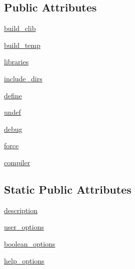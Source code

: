 \subsection*{Public Attributes}
\begin{DoxyCompactItemize}
\item 
\hyperlink{classsetuptools_1_1__distutils_1_1command_1_1build__clib_1_1build__clib_adbbb845504c2a18712782d201c98042e}{build\+\_\+clib}
\item 
\hyperlink{classsetuptools_1_1__distutils_1_1command_1_1build__clib_1_1build__clib_a4f79f4baa2d1c1db08f49344e992965a}{build\+\_\+temp}
\item 
\hyperlink{classsetuptools_1_1__distutils_1_1command_1_1build__clib_1_1build__clib_a1f44c483b10326b261561c35e5f5603b}{libraries}
\item 
\hyperlink{classsetuptools_1_1__distutils_1_1command_1_1build__clib_1_1build__clib_ab2c897ff2466048eba1fdfa34f49c655}{include\+\_\+dirs}
\item 
\hyperlink{classsetuptools_1_1__distutils_1_1command_1_1build__clib_1_1build__clib_a98fb7836f3e246f68141cb67771c560b}{define}
\item 
\hyperlink{classsetuptools_1_1__distutils_1_1command_1_1build__clib_1_1build__clib_a245b0dde6a868cc0c51f379584c4da35}{undef}
\item 
\hyperlink{classsetuptools_1_1__distutils_1_1command_1_1build__clib_1_1build__clib_aee42c73f34d36725aa53a9dc5d478089}{debug}
\item 
\hyperlink{classsetuptools_1_1__distutils_1_1command_1_1build__clib_1_1build__clib_aa89e94d28f1ecb8548f0a9ca8e4f5b33}{force}
\item 
\hyperlink{classsetuptools_1_1__distutils_1_1command_1_1build__clib_1_1build__clib_a2c561d1b845f4642a60270bec2356bfc}{compiler}
\end{DoxyCompactItemize}
\subsection*{Static Public Attributes}
\begin{DoxyCompactItemize}
\item 
\hyperlink{classsetuptools_1_1__distutils_1_1command_1_1build__clib_1_1build__clib_a779ec650d104aee92937bc2aed7e1a57}{description}
\item 
\hyperlink{classsetuptools_1_1__distutils_1_1command_1_1build__clib_1_1build__clib_ae70d09dd1c0690ee4e4b59a1f85d0ce6}{user\+\_\+options}
\item 
\hyperlink{classsetuptools_1_1__distutils_1_1command_1_1build__clib_1_1build__clib_a02917de7c7309ccf4db366981a59f4b1}{boolean\+\_\+options}
\item 
\hyperlink{classsetuptools_1_1__distutils_1_1command_1_1build__clib_1_1build__clib_ac55f9384a4a973ce81cdd5dc7e9ab452}{help\+\_\+options}
\end{DoxyCompactItemize}


